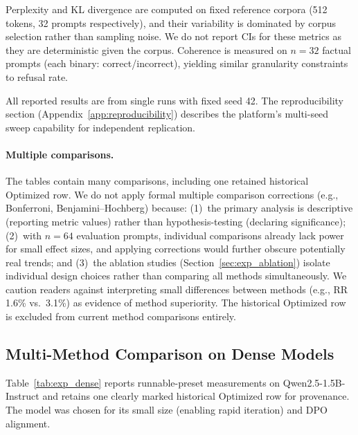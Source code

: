 \documentclass[11pt]{article}
\begin{document}
Perplexity and KL divergence are computed on fixed reference corpora (512 tokens, 32 prompts respectively), and their variability is dominated by corpus selection rather than sampling noise. We do not report CIs for these metrics as they are deterministic given the corpus. Coherence is measured on $n = 32$ factual prompts (each binary: correct/incorrect), yielding similar granularity constraints to refusal rate.

All reported results are from single runs with fixed seed 42. The reproducibility section (Appendix~\ref{app:reproducibility}) describes the platform's multi-seed sweep capability for independent replication.

\paragraph{Multiple comparisons.}
The tables contain many comparisons, including one retained historical Optimized row. We do not apply formal multiple comparison corrections (e.g., Bonferroni, Benjamini--Hochberg) because: (1)~the primary analysis is descriptive (reporting metric values) rather than hypothesis-testing (declaring significance); (2)~with $n = 64$ evaluation prompts, individual comparisons already lack power for small effect sizes, and applying corrections would further obscure potentially real trends; and (3)~the ablation studies (Section~\ref{sec:exp_ablation}) isolate individual design choices rather than comparing all methods simultaneously. We caution readers against interpreting small differences between methods (e.g., RR 1.6\% vs.\ 3.1\%) as evidence of method superiority. The historical Optimized row is excluded from current method comparisons entirely.

\subsection{Multi-Method Comparison on Dense Models}
\label{sec:exp_dense}

Table~\ref{tab:exp_dense} reports runnable-preset measurements on Qwen2.5-1.5B-Instruct and retains one clearly marked historical Optimized row for provenance. The model was chosen for its small size (enabling rapid iteration) and DPO alignment.
\end{document}

